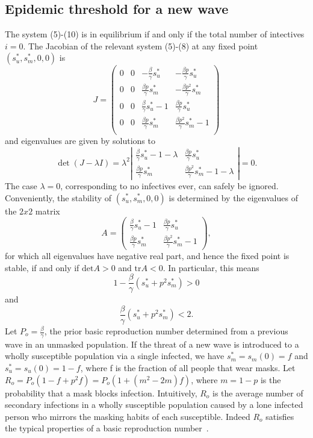 \documentclass[11pt]{article}
\begin{document}
\subsection*{Epidemic threshold for a new wave}
The system (5)-(10) is in equilibrium if and only if the total number of intectives $i = 0$. The Jacobian of the relevant system (5)-(8) at any fixed point $(s_{u}^*,s_{m}^*,0,0)$ is
\[
  J =
   \begin{pmatrix}
    0 & 0 & - \frac{\beta }{\gamma} s_{u}^* & - \frac{\beta p }{\gamma} s_{u}^* \\
    0 & 0 & \frac{\beta p }{\gamma} s_{m}^* & - \frac{\beta p^{2} }{\gamma} s_{m}^* \\
    0 & 0 & \frac{\beta }{\gamma} s_{u}^* - 1 & \frac{\beta p }{\gamma} s_{u}^* \\
    0 & 0 &  \frac{\beta p }{\gamma} s_{m}^* & \frac{\beta p^{2} }{\gamma} s_{m}^* - 1 \\
   \end{pmatrix}
\]
and eigenvalues are given by solutions to
\[
  \det(J - \lambda I) = \lambda^{2}\left |
  \begin{matrix}
   \frac{\beta }{\gamma} s_{u}^* - 1 - \lambda & \frac{\beta p }{\gamma} s_{u}^* \\
    \frac{\beta p }{\gamma} s_{m}^* & \frac{\beta p^{2} }{\gamma} s_{m}^* - 1 - \lambda
  \end{matrix}
  \right | = 0.
\]
The case $\lambda = 0$, corresponding to no infectives ever, can safely be ignored. Conveniently, the stability of $(s_{u}^*,s_{m}^*,0,0)$ is determined by the eigenvalues of the $2x2$ matrix
\[A =
\begin{pmatrix}
   \frac{\beta }{\gamma} s_{u}^* - 1 & \frac{\beta p }{\gamma} s_{u}^* \\
    \frac{\beta p }{\gamma} s_{m}^* & \frac{\beta p^{2} }{\gamma} s_{m}^* - 1
\end{pmatrix},
\]
for which all eigenvalues have negative real part, and hence the fixed point is stable, if and only if $\text{det} A > 0$ and $\text{tr} A < 0$. In particular, this means
\[
  1 - \frac{\beta}{\gamma}(s_{u}^{*} + p^{2}s_{m}^{*}) > 0
\]
and
\[
  \frac{\beta}{\gamma}(s_{u}^{*} + p^{2}s_{m}^{*}) < 2.
\]
Let $P_{o} = \frac{\beta}{\gamma}$, the prior basic reproduction number determined from a previous wave in an unmasked population. If the threat of a new wave is introduced to a wholly susceptible population via a single infected, we have $s_{m}^* = s_{m}(0) = f$ and $s_{u}^* = s_{u}(0) = 1-f$, where f is the fraction of all people that wear masks. Let $R_{o} =   P_{o}(1 - f + p^{2}f) = P_{o}(1 + (m^{2}-2m)f)$, where $m = 1 - p$ is the probability that a mask blocks infection. Intuitively, $R_{o}$ is the average number of secondary infections in a wholly susceptible population caused by a lone infected person who mirrors the masking habits of each susceptible. Indeed $R_{o}$ satisfies the typical properties of a basic reproduction number~\cite{martcheva2015introduction}.
\end{document}
